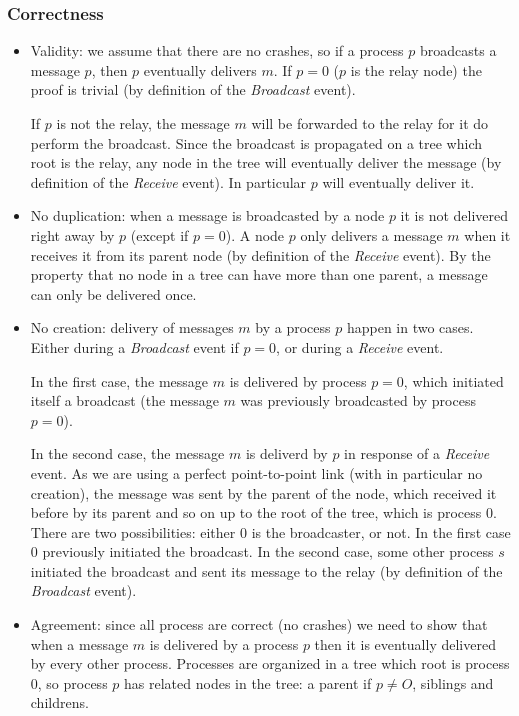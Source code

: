 \documentclass[a4paper]{article}
\begin{document}
\subsubsection*{Correctness}
\begin{itemize}
    \item Validity: we assume that there are no crashes, so if a process $p$
        broadcasts a message $p$, then $p$ eventually delivers $m$. If $p = 0$
        ($p$ is the relay node) the proof is trivial (by definition of the
        \textit{Broadcast} event).

        If $p$ is not the relay, the message $m$ will be forwarded to the
        relay for it do perform the broadcast. Since the broadcast is
        propagated on a tree which root is the relay, any node in the tree
        will eventually deliver the message (by definition of the
        \textit{Receive} event). In particular $p$ will eventually deliver it.
    \item No duplication: when a message is broadcasted by a node $p$ it is not
        delivered right away by $p$ (except if $p = 0$). A node $p$ only
        delivers a message $m$ when it receives it from its parent node (by
        definition of the \textit{Receive} event). By the property that no
        node in a tree can have more than one parent, a message can only be
        delivered once.
    \item No creation: delivery of messages $m$ by a process $p$ happen in two
        cases. Either during a \textit{Broadcast} event if $p=0$, or during a
        \textit{Receive} event.

        In the first case, the message $m$ is delivered by process $p=0$, which
        initiated itself a broadcast (the message $m$ was previously
        broadcasted by process $p=0$).

        In the second case, the message $m$ is deliverd by $p$ in response of
        a \textit{Receive} event. As we are using a perfect point-to-point
        link (with in particular no creation), the message was sent by the
        parent of the node, which received it before by its parent and so on
        up to the root of the tree, which is process $0$. There are two
        possibilities: either $0$ is the broadcaster, or not. In the first
        case $0$ previously initiated the broadcast. In the second case, some
        other process $s$ initiated the broadcast and sent its message to the
        relay (by definition of the \textit{Broadcast} event).
    \item Agreement: since all process are correct (no crashes) we need to
        show that when a message $m$ is delivered by a process $p$ then it is
        eventually delivered by every other process. Processes are organized
        in a tree which root is process $0$, so process $p$ has related nodes
        in the tree: a parent if $p \neq O$, siblings and childrens.


\end{itemize}
\end{document}
